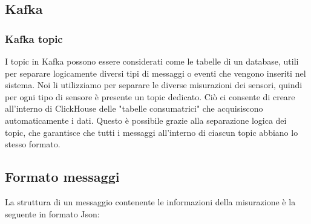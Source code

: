 \subsection{Kafka}
\subsubsection{Kafka topic}
I topic in Kafka possono essere considerati come le tabelle di un database, utili per separare logicamente diversi tipi di messaggi o eventi che vengono inseriti nel sistema. Noi li utilizziamo per separare le diverse misurazioni dei sensori, quindi per ogni tipo di sensore è presente un topic dedicato. Ciò ci consente di creare all'interno di ClickHouse delle "tabelle consumatrici" che acquisiscono automaticamente i dati. Questo è possibile grazie alla separazione logica dei topic, che garantisce che tutti i messaggi all'interno di ciascun topic abbiano lo stesso formato.
\subsection{Formato messaggi} \label{sec:formatoMessaggi}
La struttura di un messaggio contenente le informazioni della misurazione è la seguente in formato Json:
\begin{comment}
    \begin{lstlisting}[language=json,firstnumber=1]
    {
      "timestamp": "AAAA-MM-DD HH:MM:SS.sss", 
      "value": "Valore della misurazione",  
      "type": "Tipologia Simulatore",
      "latitude": "Latitudine",
      "longitude": "Longitudine",
      "ID_sensore": "ID sensore",
      "cella": "Cella dove è presente il sensore"
    }
\end{lstlisting}
\end{comment}


